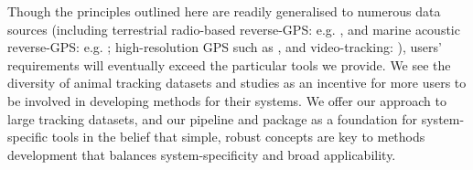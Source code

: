\begin{refsection}
    Though the principles outlined here are readily generalised to numerous data sources (including terrestrial radio-based reverse-GPS: e.g. \citealt{toledo2020}, and marine acoustic reverse-GPS: e.g. \citealt{aspillaga2021}; high-resolution GPS such as \citealt{strandburg-peshkin2015}, and video-tracking: \citealt{rathore2020}), users' requirements will eventually exceed the particular tools we provide.
    We see the diversity of animal tracking datasets and studies as an incentive for more users to be involved in developing methods for their systems.
    We offer our approach to large tracking datasets, and our pipeline and package as a foundation for system-specific tools in the belief that simple, robust concepts are key to methods development that balances system-specificity and broad applicability.

    \printbibliography[heading=subbibliography]
\end{refsection}
